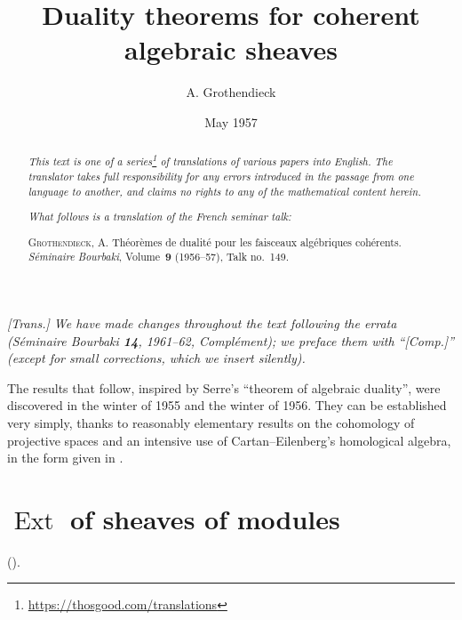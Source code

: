\documentclass{article}
\title{Duality theorems for coherent algebraic sheaves}
\author{A. Grothendieck}
\date{May 1957}
\newcommand{\doctype}{French seminar talk}
\newcommand{\origcit}{%
  \textsc{Grothendieck, A.}
  Th\'{e}or\`{e}mes de dualit\'{e} pour les faisceaux alg\'{e}briques coh\'{e}rents.
  \emph{S\'{e}minaire Bourbaki}, Volume~\textbf{9} (1956--57), Talk no.~149.%
}
\DeclareMathOperator{\Ext}{Ext}
\newcommand{\oldpage}[1]{\marginpar{\footnotesize$\Big\vert$ \textit{p.~#1}}}
\begin{document}
\maketitle
\thispagestyle{fancy}

\renewcommand{\abstractname}{Translator's note.}

\begin{abstract}
  \renewcommand*{\thefootnote}{\fnsymbol{footnote}}
  \emph{This text is one of a series\footnote{\url{https://thosgood.com/translations}} of translations of various papers into English.}
  \emph{The translator takes full responsibility for any errors introduced in the passage from one language to another, and claims no rights to any of the mathematical content herein.}

  \medskip
  
  \emph{What follows is a translation of the \doctype:}

  \medskip\noindent
  \origcit
\end{abstract}

\setcounter{footnote}{0}

\tableofcontents
\bigskip



\subsubsection*{}

\emph{[Trans.] We have made changes throughout the text following the errata (\emph{S\'{e}minaire Bourbaki} \textbf{14}, 1961--62, Compl\'{e}ment); we preface them with ``[Comp.]'' (except for small corrections, which we insert silently).}
\medskip

\oldpage{149-01}
The results that follow, inspired by Serre's ``theorem of algebraic duality'', were discovered in the winter of 1955 and the winter of 1956.
They can be established very simply, thanks to reasonably elementary results on the cohomology of projective spaces \cite{3} and an intensive use of Cartan--Eilenberg's homological algebra, in the form given in \cite{2}.


\section{\texorpdfstring{$\Ext$}{Ext} of sheaves of modules}
\label{section1}

(\cite[chap.~3 and 4]{2}).
\end{document}
